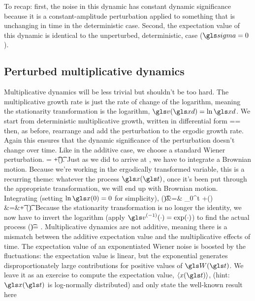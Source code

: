 To recap: first, the noise in this dynamic has constant dynamic significance because it is a constant-amplitude perturbation applied to 
something that is unchanging in time in the deterministic case. Second, the expectation value of this dynamic is identical to 
the unperturbed, deterministic, case ($\gsigma=0$).

\subsection{Perturbed multiplicative dynamics} 
Multiplicative dynamics will be less trivial but shouldn't be too hard. 
The multiplicative growth rate is just the rate of change of the logarithm, meaning the stationarity transformation is the logarithm, $\gv(\xd)=\ln \xd$.
We start from deterministic multiplicative growth, written in differential form
\be
\gm=\frac{\gd\ln \xd}{\gd\t}=\ggamma
{}
\ee
then, as before, rearrange and add the perturbation to the ergodic growth rate. Again this 
ensures that the dynamic significance of the perturbation doesn't change over time.
Like in the additive case, we choose a standard Wiener perturbation.
\bea
\gd \ln \x= \ggamma  \gd\t +\gsigma \gd \gW(\t).
\eea
Just as we did to arrive at , we have to integrate a Brownian motion. Because we're 
working in the ergodically transformed variable, this is a recurring theme: whatever the process 
$\x(\t)$, once it's been put through the appropriate transformation, we will end up with Brownian 
motion. Integrating  (setting $\ln \x(0)=0$ for simplicity),
\bea
\ln \x(\t)&=& \int_0^t \ggamma  \gd\gs +\gsigma \gd \gW(\gs)\\
&=&\ggamma \t + \gsigma \gW(\t).
\eea
Because the stationarity transformation is no longer the identity, we now have to invert the 
logarithm (apply $\gv^{(-1)}(\cdot)=\exp(\cdot)$) to find the actual process
\bea
\x(\t)= \exp\left[\ggamma \t + \gsigma \gW(\t)\right].
\eea
Multiplicative dynamics are not additive, meaning there is a mismatch between the additive 
expectation value and the multiplicative effects of time. The expectation value of an 
exponentiated Wiener noise is boosted by the fluctuations: the expectation value is linear, 
but the exponential generates disproportionately large contributions for positive values of 
$\gW(\t)$. We leave it as an exercise to compute the expectation value, $\ave{x(\t)}$, 
(hint: $\x(\t)$ is log-normally distributed) and only state the well-known result here
\bea
